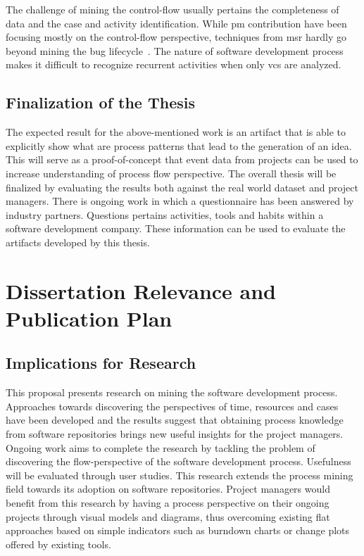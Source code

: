 \documentclass[a4paper,11pt]{article}
\begin{document}
The challenge of mining the control-flow usually pertains the completeness of data and the case and activity identification. While \gls{pm} contribution have been focusing mostly on the control-flow perspective, techniques from \gls{msr} hardly go beyond mining the bug lifecycle~\cite{Akbarinasaji2018a}. The nature of software development process makes it difficult to recognize recurrent activities when only \gls{vcs} are analyzed. 

\subsection{Finalization of the Thesis}

The expected result for the above-mentioned work is an artifact that is able to explicitly show what are process patterns that lead to the generation of an idea. This will serve as a proof-of-concept that event data from projects can be used to increase understanding of process flow perspective. The overall thesis will be finalized by evaluating the results both against the real world dataset and project managers. There is ongoing work in which a questionnaire has been answered by industry partners. Questions pertains activities, tools and habits within a software development company. These information can be used to evaluate the artifacts developed by this thesis.

\section{Dissertation Relevance and Publication Plan}
\label{sec:dissertation-relevance}

\subsection{Implications for Research}

This proposal presents research on mining the software development process.
Approaches towards discovering the perspectives of time, resources and cases
have been developed and the results suggest that obtaining process knowledge
from software repositories brings new useful insights for the project managers.
Ongoing work aims to complete the research by tackling the problem of
discovering the flow-perspective of the software development process. Usefulness
will be evaluated through user studies.
This research extends the process mining field towards its adoption on software
repositories. Project managers would benefit from this research by having a
process perspective on their ongoing projects through visual models and diagrams,
thus overcoming existing flat approaches based on simple indicators such as
burndown charts or change plots offered by existing tools.
\end{document}
